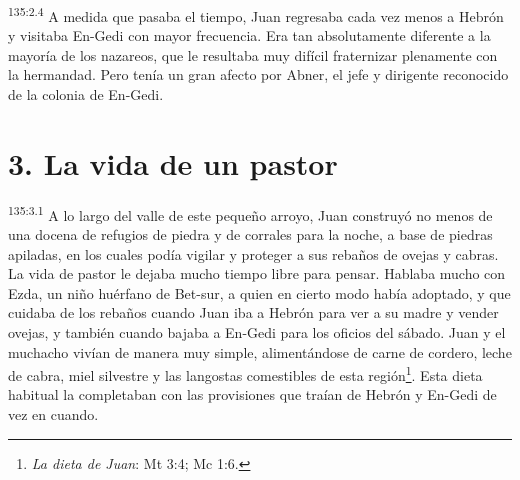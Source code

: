 \par 
\textsuperscript{135:2.4} A medida que pasaba el tiempo, Juan regresaba cada vez menos a Hebrón y visitaba En-Gedi con mayor frecuencia. Era tan absolutamente diferente a la mayoría de los nazareos, que le resultaba muy difícil fraternizar plenamente con la hermandad. Pero tenía un gran afecto por Abner, el jefe y dirigente reconocido de la colonia de En-Gedi.

\section*{3. La vida de un pastor}
\par 
\textsuperscript{135:3.1} A lo largo del valle de este pequeño arroyo, Juan construyó no menos de una docena de refugios de piedra y de corrales para la noche, a base de piedras apiladas, en los cuales podía vigilar y proteger a sus rebaños de ovejas y cabras. La vida de pastor le dejaba mucho tiempo libre para pensar. Hablaba mucho con Ezda, un niño huérfano de Bet-sur, a quien en cierto modo había adoptado, y que cuidaba de los rebaños cuando Juan iba a Hebrón para ver a su madre y vender ovejas, y también cuando bajaba a En-Gedi para los oficios del sábado. Juan y el muchacho vivían de manera muy simple, alimentándose de carne de cordero, leche de cabra, miel silvestre y las langostas comestibles de esta región\footnote{\textit{La dieta de Juan}: Mt 3:4; Mc 1:6.}. Esta dieta habitual la completaban con las provisiones que traían de Hebrón y En-Gedi de vez en cuando.

